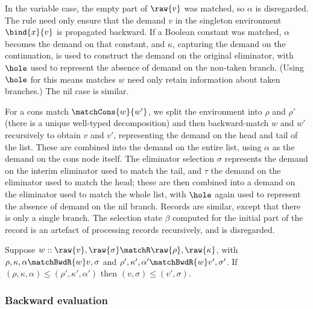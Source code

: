 

In the variable case, the empty part of $\raw{v}$ was matched, so $\alpha$ is disregarded. The rule need only ensure that the demand $v$ in the singleton environment $\bind{x}{v}$ is propagated backward. If a Boolean constant was matched, $\alpha$ becomes the demand on that constant, and $\kappa$, capturing the demand on the continuation, is used to construct the demand on the original eliminator, with $\hole$ used to represent the absence of demand on the non-taken branch. (Using $\hole$ for this means matches $w$ need only retain information about taken branches.) The nil case is similar.

For a cons match $\matchCons{w}{w'}$, we split the environment into $\rho$ and $\rho'$ (there is a unique well-typed decomposition) and then backward-match $w$ and $w'$ recursively to obtain $v$ and $v'$, representing the demand on the head and tail of the list. These are combined into the demand on the entire list, using $\alpha$ as the demand on the cons node itself. The eliminator selection $\sigma$ represents the demand on the interim eliminator used to match the tail, and $\tau$ the demand on the eliminator used to match the head; these are then combined into a demand on the eliminator used to match the whole list, with $\hole$ again used to represent the absence of demand on the nil branch. Records are similar, except that there is only a single branch. The selection state $\beta$ computed for the initial part of the record is an artefact of processing records recursively, and is disregarded.

\begin{lemma}
   Suppose $w :: \raw{v}, \raw{\sigma} \matchR \raw{\rho}, \raw{\kappa}$, with $\rho, \kappa, \alpha \matchBwdR{w} v, \sigma$ and $\rho', \kappa', \alpha' \matchBwdR{w} v', \sigma'$. If $(\rho, \kappa, \alpha) \leq (\rho', \kappa', \alpha')$ then $(v, \sigma) \leq (v', \sigma)$.
\end{lemma}

\subsubsection{Backward evaluation}
\label{sec:data-dependencies:analyses:bwd:eval}

